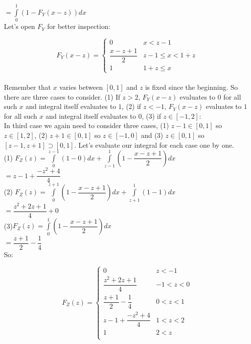 \documentclass[12pt]{article}
\begin{document}
$ = \displaystyle\int\limits_{0}^{1} ( 1- F_Y(x-z) ) dx  $  \\

Let's open $F_Y$ for better inspection:

\[  F_Y(x-z)  = \begin{cases} 
		0 & x < z-1 \\
		\dfrac{x-z+1}{2} &  z-1 \leq x < 1 + z \\
		1 & 1+z \leq x
      
   \end{cases}
\] \\

Remember that $x$ varies between $[0,1]$ and $z$ is fixed since the beginning.  So there are three cases to consider. (1) If $z>2$, $F_Y(x-z)$ evaluates to $0$ for all such $x$ and integral itself evaluates to $1$, (2) if $z<-1$, $F_Y(x-z)$ evaluates to $1$ for all such $x$ and integral itself evaluates to $0$, (3) if $z\in [-1,2]$:\\

In third case we again need to consider three cases, (1) $z-1\in [0,1]$ so $z\in [1,2]$, (2) $z+1\in [0,1]$ so $z\in [-1,0]$ and (3) $z\in [0,1]$ so $[z-1,z+1] \supset [0,1]$. Let's evaluate our integral for each case one by one. \\

(1) $F_Z(z) =  \displaystyle\int\limits_{0}^{z-1} (1-0)dx + \displaystyle\int\limits_{z-1}^{1} (1-\dfrac{x-z+1}{2}) dx $ \\ 

$ = z-1 +\dfrac{-z^2+4}{4}$ \\

(2) $F_Z(z) =  \displaystyle\int\limits_{0}^{z+1} (1-\dfrac{x-z+1}{2})  dx + \displaystyle\int\limits_{z+1}^{1} (1-1) dx $ \\ 

$ = \dfrac{z^2+2z+1}{4} +0$ \\

(3)$ F_Z(z) = \displaystyle\int\limits_{0}^{1} (1-\dfrac{x-z+1}{2}) dx $ \\ 

$ = \dfrac{z+1}{2}-\dfrac{1}{4} $ \\ 

So:

\[  F_Z(z) = \begin{cases} 
		0 & z < -1\\
        \dfrac{z^2+2z+1}{4} & -1 < z < 0 \\
       \dfrac{z+1}{2}-\dfrac{1}{4}  & 0 < z < 1 \\ 
        z-1 +\dfrac{-z^2+4}{4} & 1 < z < 2 \\
       1 & 2 < z \\
      
   \end{cases}
\] \\
\end{document}
